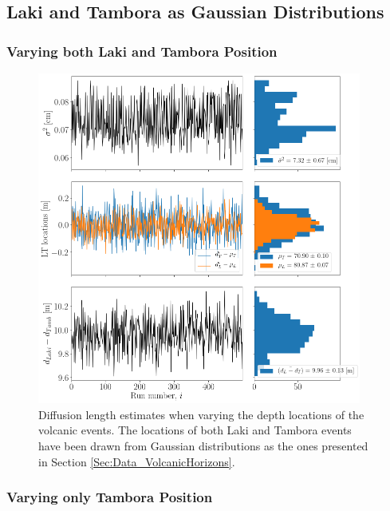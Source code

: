 \documentclass[../../CompleteThesis2/Complete_2ndDraft]{subfiles}
\begin{document}
\subsection[LT locations]{Laki and Tambora as Gaussian Distributions}
\label{Subsec:Method_TestStab_LTlocations}



\subsubsection[Vary L and T]{Varying both Laki and Tambora Position}
\label{Subsubsec:Method_TestStab_LTlocations_LandT}

\begin{figure}[h]
	\centering
	\includegraphics[width=0.95\textwidth]{SiteA_Vary_LandT.png}
	\caption[Diffusion Length Variations, Varying Laki and Tambora]{\small Diffusion length estimates when varying the depth locations of the volcanic events. The locations of both Laki and Tambora events have been drawn from Gaussian distributions as the ones presented in Section \ref{Sec:Data_VolcanicHorizons}.}
	\label{fig:SiteA_Vary_LandT}
\end{figure}



\subsubsection[Vary T]{Varying only Tambora Position}
\label{Subsubsec:Method_TestStab_LTlocations_T}
\end{document}
